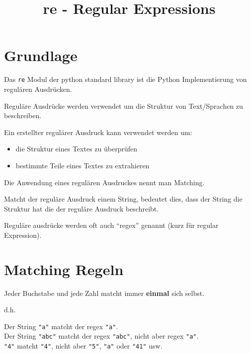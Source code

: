 \documentclass[ignorenonframetext,]{beamer}
\title{re - Regular Expressions}
\date{}
\providecommand{\tightlist}{%
  \setlength{\itemsep}{0pt}\setlength{\parskip}{0pt}}
\begin{document}
\frame{\titlepage}

\section{Grundlage}\label{grundlage}

\begin{frame}

Das \texttt{re} Modul der python standard library ist die Python
Implementierung von regulären Ausdrücken.

Reguläre Ausdrücke werden verwendet um die Struktur von Text/Sprachen zu
beschreiben.

\end{frame}

\begin{frame}

Ein erstellter regulärer Ausdruck kann verwendet werden um:

\begin{itemize}
\tightlist
\item
  die Struktur eines Textes zu überprüfen
\item
  bestimmte Teile eines Textes zu extrahieren
\end{itemize}

\end{frame}

\begin{frame}

Die Anwendung eines regulären Ausdruckes nennt man Matching.

Matcht der reguläre Ausdruck einem String, bedeutet dies, dass der
String die Struktur hat die der reguläre Ausdruck beschreibt.

Reguläre ausdrücke werden oft auch ``regex'' genannt (kurz für regular
Expression).

\end{frame}

\section{Matching Regeln}\label{matching-regeln}

\begin{frame}

Jeder Buchstabe und jede Zahl matcht immer \textbf{einmal} sich selbst.

d.h.

Der String \texttt{"a"} matcht der regex \texttt{"a"}.\\
Der String \texttt{"abc"} matcht der regex \texttt{"abc"}, nicht aber
regex \texttt{"a"}.\\
\texttt{"4"} matcht \texttt{"4"}, nicht aber \texttt{"5"}, \texttt{"a"}
oder \texttt{"41"} usw.

\end{frame}
\end{document}
